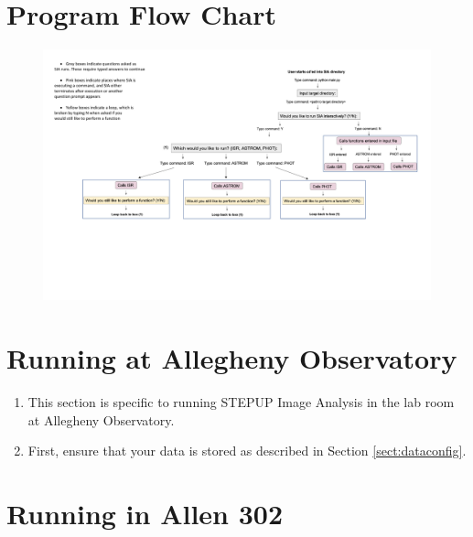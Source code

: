 \documentclass[11pt]{report}
\begin{document}
\section{Program Flow Chart}
\begin{figure}[h!]
\begin{center}
\includegraphics[width=1.3\textwidth,center]{SIA_flow_chart.pdf}
\end{center}
\end{figure}


\section{Running at Allegheny Observatory}

\begin{enumerate}
\item This section is specific to running STEPUP Image Analysis in the lab room at Allegheny Observatory. 
\item First, ensure that your data is stored as described in Section \ref{sect:dataconfig}.
\end{enumerate}


\section{Running in Allen 302}
\end{document}

